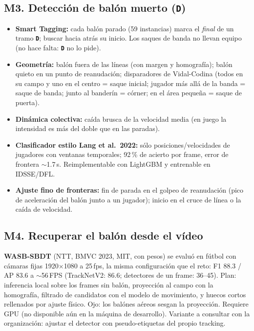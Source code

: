 \documentclass[11pt,a4paper]{article}
\newcommand{\lab}[1]{\texttt{\textbf{#1}}}
\begin{document}
\subsection{M3. Detecci\'on de bal\'on muerto (\lab{D})}
\begin{itemize}
  \item \textbf{Smart Tagging:} cada bal\'on parado (59 instancias) marca el \emph{final} de un
        tramo \lab{D}; buscar hacia atr\'as su inicio. Los saques de banda no llevan equipo
        (no hace falta: \lab{D} no lo pide).
  \item \textbf{Geometr\'ia:} bal\'on fuera de las l\'ineas (con margen y homograf\'ia); bal\'on quieto en
        un punto de reanudaci\'on; disparadores de Vidal-Codina (todos en su campo y uno en el
        centro = saque inicial; jugador m\'as all\'a de la banda = saque de banda; junto al
        bander\'in = c\'orner; en el \'area peque\~na = saque de puerta).
  \item \textbf{Din\'amica colectiva:} ca\'ida brusca de la velocidad media (en juego la intensidad
        es m\'as del doble que en las paradas).
  \item \textbf{Clasificador estilo Lang et al.\ 2022:} s\'olo posiciones/velocidades de jugadores
        con ventanas temporales; 92\,\% de acierto por frame, error de frontera $\sim$1.7\,s.
        Reimplementable con LightGBM y entrenable en IDSSE/DFL.
  \item \textbf{Ajuste fino de fronteras:} fin de parada en el golpeo de reanudaci\'on (pico de
        aceleraci\'on del bal\'on junto a un jugador); inicio en el cruce de l\'inea o la ca\'ida de
        velocidad.
\end{itemize}

\subsection{M4. Recuperar el bal\'on desde el v\'ideo}
\textbf{WASB-SBDT} (NTT, BMVC 2023, MIT, con pesos) se evalu\'o en f\'utbol con c\'amaras fijas
1920$\times$1080 a 25\,fps, la misma configuraci\'on que el reto: F1 88.3 / AP 83.6 a $\sim$56\,FPS
(TrackNetV2: 86.6; detectores de un frame: 36--45). Plan: inferencia local sobre los frames sin
bal\'on, proyecci\'on al campo con la homograf\'ia, filtrado de candidatos con el modelo de
movimiento, y huecos cortos rellenados por ajuste f\'isico. Ojo: los bal\'ones a\'ereos sesgan la
proyecci\'on. Requiere GPU (no disponible a\'un en la m\'aquina de desarrollo). Variante a consultar
con la organizaci\'on: ajustar el detector con pseudo-etiquetas del propio tracking.
\end{document}
